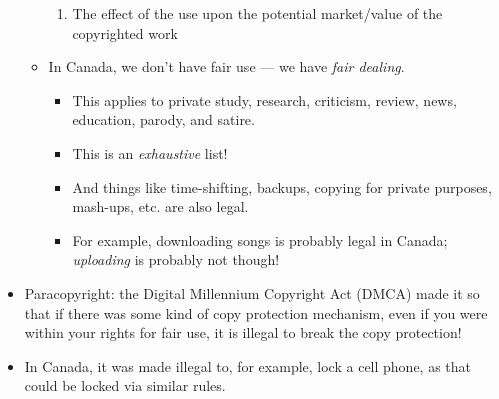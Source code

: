 \documentclass{article}
\begin{document}
\begin{itemize}
\begin{itemize}
\begin{enumerate}
                    \item The effect of the use upon the potential market/value of the copyrighted work
                \end{enumerate}
            \item In Canada, we don't have fair use --- we have \emph{fair dealing}.
                \begin{itemize}
                    \item This applies to private study, research, criticism, review, news, education, parody, and satire.
                    \item This is an \emph{exhaustive} list!
                    \item And things like time-shifting, backups, copying for private purposes, mash-ups, etc. are also legal.
                    \item For example, downloading songs is probably legal in Canada; \emph{uploading} is probably not though!
                \end{itemize}
        \end{itemize}
    \item Paracopyright: the Digital Millennium Copyright Act (DMCA) made it so that if there was some kind of copy protection mechanism, even if you were within your rights for fair use, it is illegal to break the copy protection!
    \item In Canada, it was made illegal to, for example, lock a cell phone, as that could be locked via similar rules.
\end{itemize}
\end{document}
